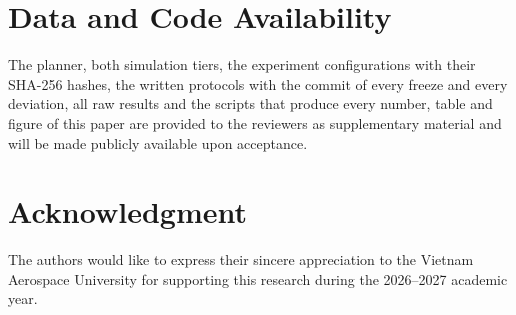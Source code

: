 \section*{Data and Code Availability}
The planner, both simulation tiers, the experiment configurations with their SHA-256 hashes, the written protocols
with the commit of every freeze and every deviation, all raw results and the scripts that produce every number, table
and figure of this paper are provided to the reviewers as supplementary material and will be made publicly available
upon acceptance.

\section*{Acknowledgment}
The authors would like to express their sincere appreciation to the Vietnam Aerospace University for supporting this
research during the 2026--2027 academic year.
